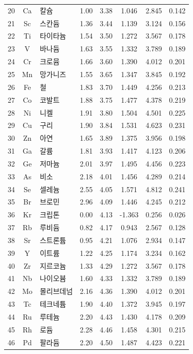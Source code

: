 \documentclass[12pt,a4paper]{article}
\begin{document}
\begin{longtable}{|c|c|p{2.5cm}|c|c|c|c|c|}
		20 & Ca & 칼슘 & 1.00 & 3.38 & 1.046 & 2.845 & 0.142 \\
		21 & Sc & 스칸듐 & 1.36 & 3.44 & 1.139 & 3.124 & 0.156 \\
		22 & Ti & 타이타늄 & 1.54 & 3.50 & 1.272 & 3.567 & 0.178 \\
		23 & V & 바나듐 & 1.63 & 3.55 & 1.332 & 3.789 & 0.189 \\
		24 & Cr & 크로뮴 & 1.66 & 3.60 & 1.390 & 4.012 & 0.201 \\
		25 & Mn & 망가니즈 & 1.55 & 3.65 & 1.347 & 3.845 & 0.192 \\
		26 & Fe & 철 & 1.83 & 3.70 & 1.449 & 4.256 & 0.213 \\
		27 & Co & 코발트 & 1.88 & 3.75 & 1.477 & 4.378 & 0.219 \\
		28 & Ni & 니켈 & 1.91 & 3.80 & 1.504 & 4.501 & 0.225 \\
		29 & Cu & 구리 & 1.90 & 3.84 & 1.531 & 4.623 & 0.231 \\
		30 & Zn & 아연 & 1.65 & 3.89 & 1.375 & 3.956 & 0.198 \\
		31 & Ga & 갈륨 & 1.81 & 3.93 & 1.417 & 4.123 & 0.206 \\
		32 & Ge & 저마늄 & 2.01 & 3.97 & 1.495 & 4.456 & 0.223 \\
		33 & As & 비소 & 2.18 & 4.01 & 1.456 & 4.289 & 0.214 \\
		34 & Se & 셀레늄 & 2.55 & 4.05 & 1.571 & 4.812 & 0.241 \\
		35 & Br & 브로민 & 2.96 & 4.09 & 1.446 & 4.245 & 0.212 \\
		36 & Kr & 크립톤 & 0.00 & 4.13 & -1.363 & 0.256 & 0.026 \\
		37 & Rb & 루비듐 & 0.82 & 4.17 & 0.943 & 2.567 & 0.128 \\
		38 & Sr & 스트론튬 & 0.95 & 4.21 & 1.076 & 2.934 & 0.147 \\
		39 & Y & 이트륨 & 1.22 & 4.25 & 1.174 & 3.234 & 0.162 \\
		40 & Zr & 지르코늄 & 1.33 & 4.29 & 1.272 & 3.567 & 0.178 \\
		41 & Nb & 나이오븀 & 1.60 & 4.33 & 1.332 & 3.789 & 0.189 \\
		42 & Mo & 몰리브데넘 & 2.16 & 4.36 & 1.390 & 4.012 & 0.201 \\
		43 & Tc & 테크네튬 & 1.90 & 4.40 & 1.372 & 3.945 & 0.197 \\
		44 & Ru & 루테늄 & 2.20 & 4.43 & 1.430 & 4.178 & 0.209 \\
		45 & Rh & 로듐 & 2.28 & 4.46 & 1.458 & 4.301 & 0.215 \\
		46 & Pd & 팔라듐 & 2.20 & 4.50 & 1.487 & 4.423 & 0.221 \\

\end{longtable}
\end{document}
